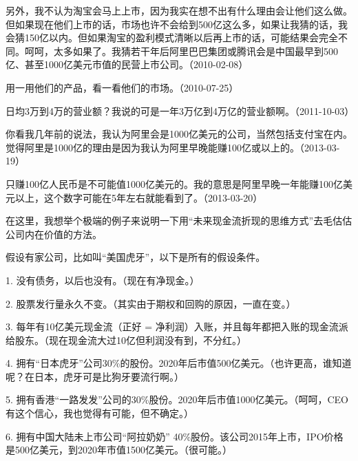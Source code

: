 另外，我不认为淘宝会马上上市，因为我实在想不出有什么理由会让他们这么做。但如果现在他们上市的话，市场也许不会给到500亿这么多，如果让我猜的话，我会猜150亿以内。但如果淘宝的盈利模式清晰以后再上市的话，可能结果会完全不同。呵呵，太多如果了。我猜若干年后阿里巴巴集团或腾讯会是中国最早到500亿、甚至1000亿美元市值的民营上市公司。（2010-02-08）


用一用他们的产品，看一看他们的市场。（2010-07-25）


日均3万到4万的营业额？我说的可是一年3万亿到4万亿的营业额啊。（2011-10-03）


你看我几年前的说法，我认为阿里会是1000亿美元的公司，当然包括支付宝在内。觉得阿里是1000亿的理由是因为我认为阿里早晚能赚100亿或以上的。（2013-03-19）


只赚100亿人民币是不可能值1000亿美元的。我的意思是阿里早晚一年能赚100亿美元以上，这个数字可能在5年左右就能看到了。（2013-03-20）

在这里，我想举个极端的例子来说明一下用“未来现金流折现的思维方式”去毛估估公司内在价值的方法。

假设有家公司，比如叫“美国虎牙”，以下是所有的假设条件。

1. 没有债务，以后也没有。（现在有净现金。）

2. 股票发行量永久不变。（其实由于期权和回购的原因，一直在变。）

3. 每年有10亿美元现金流（正好 = 净利润）入账，并且每年都把入账的现金流派给股东。（现在现金流大过10亿但利润没有到，不分红。）

4. 拥有“日本虎牙”公司30\%的股份。2020年后市值500亿美元。（也许更高，谁知道呢？在日本，虎牙可是比狗牙要流行啊。）

5. 拥有香港“一路发发”公司的30\%股份。2020年后市值1000亿美元。（呵呵，CEO有这个信心，我也觉得有可能，但不确定。）

6. 拥有中国大陆未上市公司“阿拉奶奶” 40\%股份。该公司2015年上市，IPO价格是500亿美元，到2020年市值1500亿美元。（很可能。）

